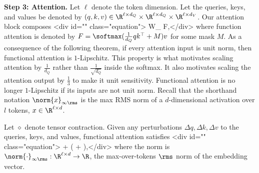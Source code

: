\textbf{Step 3: Attention.} Let $\ell$ denote the token dimension. Let the queries, keys, and values be denoted by $(q, k, v) \in \R^{\ell \times d_Q} \times \R^{\ell \times d_Q} \times \R^{\ell \times d_V}$. Our attention block composes <div id="" class="equation">     W_ \circ F,</div> where function attention is denoted by $F = \softmax(\tfrac{1}{d_Q} qk^\top + M)v$ for some mask $M$. As a consequence of the following theorem, if every attention input is unit norm, then functional attention is $1$-Lipschitz. This property is what motivates scaling attention by $\tfrac{1}{d_Q}$ rather than $\tfrac{1}{\sqrt{d_Q}}$ inside the softmax. It also motivates scaling the attention output by $\tfrac{1}{3}$ to make it unit sensitivity. Functional attention is no longer $1$-Lipschitz if its inputs are not unit norm. Recall that the shorthand notation $\norm{x}_{\infty\rms}$ is the max RMS norm of a $d$-dimensional activation over $l$ tokens, $x \in \R^{\ell \times d}$.

\begin{theorembox}
    \label{thm:function-attention-is-lipschitz}
    Let $\diamond$ denote tensor contraction. Given any perturbations $\Delta q, \Delta k, \Delta v$ to the queries, keys, and values, functional attention satisfies <div id="" class="equation">     \leq {} +  (  +  ),</div> where the norm is $\norm{\cdot}_{\infty \rms} : \R^{\ell \times d} \to \R$, the max-over-tokens $\rms$ norm of the embedding vector.
\end{theorembox}

